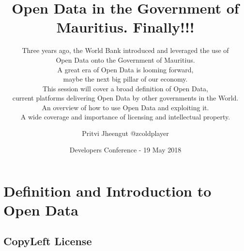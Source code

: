 \documentclass{beamer}
\author{Pritvi Jheengut @zcoldplayer}
\begin{document}
\section{Definition and Introduction to Open Data}

\title[DevConMU - Open Data]{Open Data in the Government of 
  Mauritius. Finally!!!}
\subtitle{Three years ago, the World Bank introduced and
  leveraged the  use of \\
  Open Data onto the Government of Mauritius. \\
  A great era of Open Data is looming forward, \\
  maybe the next big pillar of our economy. \\
  This session will cover a broad definition of Open Data,\\
  current platforms delivering Open Data by other governments in 
  the World. \\
  An overview of how to use Open Data and exploiting it.\\
  A wide coverage and importance of licensing and intellectual
  property.  
}

\date[Developers Conference - Educator 2]{Developers Conference
  -  19 May 2018}

\maketitle

\subsection{CopyLeft License}

\end{document}
